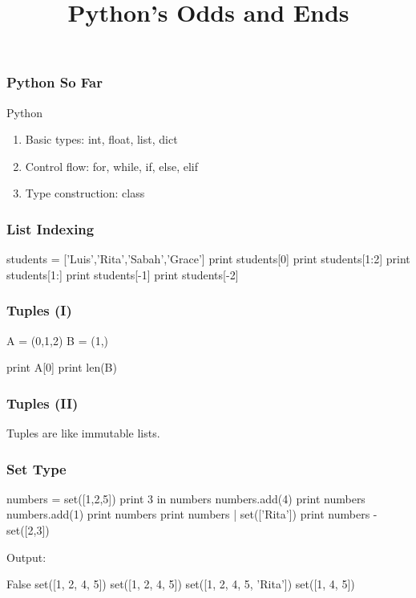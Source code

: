 
\title{Python's Odds and Ends}

\frame{\maketitle}

\begin{frame}[fragile]
\frametitle{Python So Far}

\begin{block}{Python}
\begin{enumerate}
\item Basic types: int, float, list, dict
\item Control flow: for, while, if, else, elif
\item Type construction: class
\end{enumerate}
\end{block}

\end{frame}

\begin{frame}[fragile]
\frametitle{List Indexing}

\begin{python}
students = ['Luis','Rita','Sabah','Grace']
print students[0]
print students[1:2]
print students[1:]
print students[-1]
print students[-2]
\end{python}
\end{frame}

\begin{frame}[fragile]
\frametitle{Tuples (I)}
\begin{python}
A = (0,1,2)
B = (1,)

print A[0]
print len(B)
\end{python}

\end{frame}

\begin{frame}[fragile]
\frametitle{Tuples (II)}
Tuples are like \alert{immutable} lists.
\end{frame}

\begin{frame}[fragile]
\frametitle{Set Type}
\begin{python}
numbers = set([1,2,5])
print 3 in numbers
numbers.add(4)
print numbers
numbers.add(1)
print numbers
print numbers | set(['Rita'])
print numbers - set([2,3])
\end{python}

Output:
\begin{python}
False
set([1, 2, 4, 5])
set([1, 2, 4, 5])
set([1, 2, 4, 5, 'Rita'])
set([1, 4, 5])
\end{python}

\end{frame}

